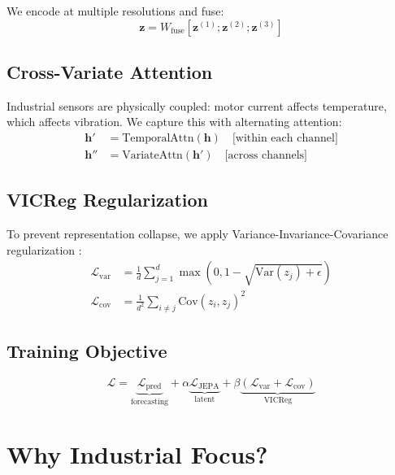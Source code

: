 \documentclass{article}
\begin{document}
We encode at multiple resolutions and fuse:
\begin{equation}
    \mathbf{z} = W_{\text{fuse}} [\mathbf{z}^{(1)}; \mathbf{z}^{(2)}; \mathbf{z}^{(3)}]
\end{equation}

\subsection{Cross-Variate Attention}

Industrial sensors are physically coupled: motor current affects temperature, which affects vibration. We capture this with alternating attention:
\begin{align}
    \mathbf{h}' &= \text{TemporalAttn}(\mathbf{h}) \quad \text{[within each channel]} \\
    \mathbf{h}'' &= \text{VariateAttn}(\mathbf{h}') \quad \text{[across channels]}
\end{align}

\subsection{VICReg Regularization}

To prevent representation collapse, we apply Variance-Invariance-Covariance regularization \cite{vicreg, cjepa}:
\begin{align}
    \mathcal{L}_{\text{var}} &= \frac{1}{d} \sum_{j=1}^d \max(0, 1 - \sqrt{\text{Var}(z_j) + \epsilon}) \\
    \mathcal{L}_{\text{cov}} &= \frac{1}{d^2} \sum_{i \neq j} \text{Cov}(z_i, z_j)^2
\end{align}

\subsection{Training Objective}

\begin{equation}
    \mathcal{L} = \underbrace{\mathcal{L}_{\text{pred}}}_{\text{forecasting}} + \alpha \underbrace{\mathcal{L}_{\text{JEPA}}}_{\text{latent}} + \beta \underbrace{(\mathcal{L}_{\text{var}} + \mathcal{L}_{\text{cov}})}_{\text{VICReg}}
\end{equation}

\section{Why Industrial Focus?}
\end{document}
